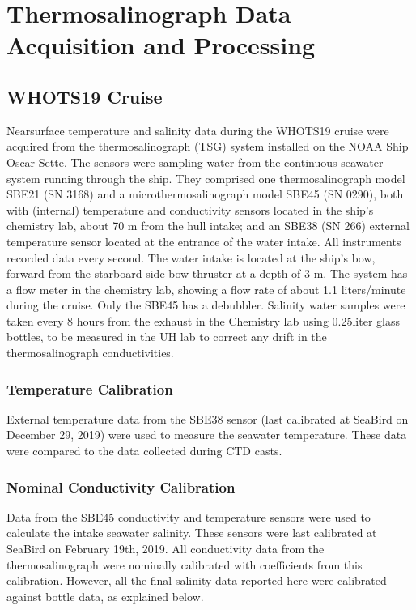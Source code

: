 \documentclass[a4paper,10pt,english,openany,oneside]{sphinxmanual}
\begin{document}
\section{Thermosalinograph Data Acquisition and Processing}
\label{\detokenize{4_section:thermosalinograph-data-acquisition-and-processing}}

\subsection{WHOTS\sphinxhyphen{}19 Cruise}
\label{\detokenize{4_section:whots-19-cruise}}
\sphinxAtStartPar
Near\sphinxhyphen{}surface temperature and salinity data during the WHOTS\sphinxhyphen{}19 cruise were
acquired from the thermosalinograph (TSG) system installed on the NOAA Ship
Oscar Sette. The sensors were sampling water from the continuous seawater
system running through the ship. They comprised one thermosalinograph
model SBE\sphinxhyphen{}21 (SN 3168) and a micro\sphinxhyphen{}thermosalinograph model SBE\sphinxhyphen{}45 (SN 0290),
both with (internal) temperature and conductivity sensors located in the ship’s
chemistry lab, about 70 m from the hull intake; and an SBE\sphinxhyphen{}38 (SN 266) external
temperature sensor located at the entrance of the water intake. All instruments
recorded data every second. The water intake is located at the ship’s bow,
forward from the starboard side bow thruster at a depth of 3 m. The system has
a flow meter in the chemistry lab, showing a flow rate of about 1.1
liters/minute during the cruise. Only the SBE\sphinxhyphen{}45 has a debubbler. Salinity
water samples were taken every 8 hours from the exhaust in the Chemistry lab
using 0.25\sphinxhyphen{}liter glass bottles, to be measured in the UH lab to correct any
drift in the thermosalinograph conductivities.


\subsubsection{Temperature Calibration}
\label{\detokenize{4_section:temperature-calibration}}
\sphinxAtStartPar
External temperature data from the SBE\sphinxhyphen{}38 sensor (last calibrated at Sea\sphinxhyphen{}Bird
on December 29, 2019) were used to measure the seawater temperature. These
data were compared to the data collected during CTD casts.


\subsubsection{Nominal Conductivity Calibration}
\label{\detokenize{4_section:nominal-conductivity-calibration}}
\sphinxAtStartPar
Data from the SBE\sphinxhyphen{}45 conductivity and temperature sensors were used to
calculate the intake seawater salinity. These sensors were last calibrated at
Sea\sphinxhyphen{}Bird on February 19th, 2019. All conductivity data from the
thermosalinograph were nominally calibrated with coefficients from this
calibration. However, all the final salinity data reported here were calibrated
against bottle data, as explained below.
\end{document}
